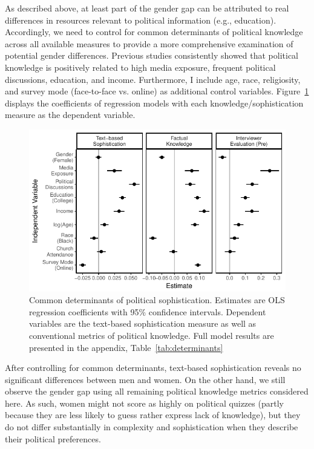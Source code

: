 \documentclass[12pt]{article}
\begin{document}
As described above, at least part of the gender gap can be attributed to real differences in resources relevant to political information (e.g., education). Accordingly, we need to control for common determinants of political knowledge across all available measures to provide a more comprehensive examination of potential gender differences. Previous studies consistently showed that political knowledge is positively related to high media exposure, frequent political discussions, education, and income. Furthermore, I include age, race, religiosity, and survey mode (face-to-face vs. online) as additional control variables. Figure~\ref{fig:determinants} displays the coefficients of regression models with each knowledge/sophistication measure as the dependent variable.

\begin{figure}[h]\centering
\includegraphics{../fig/determinants_pres.pdf}
\caption{Common determinants of political sophistication. Estimates are OLS regression coefficients with 95\% confidence intervals. Dependent variables are the text-based sophistication measure as well as conventional metrics of political knowledge. Full model results are presented in the appendix, Table~\ref{tab:determinants}}\label{fig:determinants}
\end{figure}

After controlling for common determinants, text-based sophistication reveals no significant differences between men and women. On the other hand, we still observe the gender gap using all remaining political knowledge metrics considered here. As such, women might not score as highly on political quizzes (partly because they are less likely to guess rather express lack of knowledge), but they do not differ substantially in complexity and sophistication when they describe their political preferences.
\end{document}
